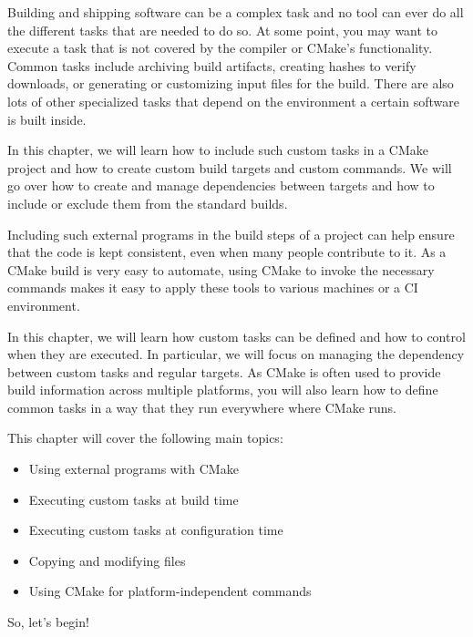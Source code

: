 Building and shipping software can be a complex task and no tool can ever do all the different tasks that are needed to do so. At some point, you may want to execute a task that is not covered by the compiler or CMake's functionality. Common tasks include archiving build artifacts, creating hashes to verify downloads, or generating or customizing input files for the build. There are also lots of other specialized tasks that depend on the environment a certain software is built inside.

In this chapter, we will learn how to include such custom tasks in a CMake project and how to create custom build targets and custom commands. We will go over how to create and manage dependencies between targets and how to include or exclude them from the standard builds.

Including such external programs in the build steps of a project can help ensure that the code is kept consistent, even when many people contribute to it. As a CMake build is very easy to automate, using CMake to invoke the necessary commands makes it easy to apply these tools to various machines or a CI environment.

In this chapter, we will learn how custom tasks can be defined and how to control when they are executed. In particular, we will focus on managing the dependency between custom tasks and regular targets. As CMake is often used to provide build information across multiple platforms, you will also learn how to define common tasks in a way that they run everywhere where CMake runs.

This chapter will cover the following main topics:

\begin{itemize}
\item 
Using external programs with CMake

\item 
Executing custom tasks at build time

\item 
Executing custom tasks at configuration time

\item 
Copying and modifying files

\item 
Using CMake for platform-independent commands
\end{itemize}

So, let's begin!




